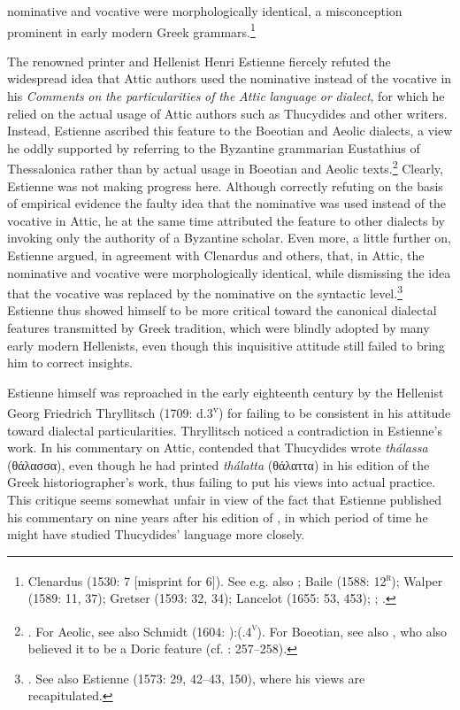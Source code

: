 nominative and vocative were morphologically identical, a misconception prominent in early modern Greek grammars.\footnote{Clenardus (1530: 7 [misprint for 6]). See e.g. also \citet[534]{Crusius1558}; Baile (1588: 12\textsc{\textsuperscript{r}}); Walper (1589: 11, 37); Gretser (1593: 32, 34); Lancelot (1655: 53, 453); \citet[101]{Giraudeau1739}; \citet[20]{Facius1782}.}

The renowned printer and Hellenist Henri Estienne fiercely refuted the widespread idea that Attic authors used the nominative instead of the vocative in his \textit{Comments} \textit{on} \textit{the} \textit{particularities} \textit{of} \textit{the} \textit{Attic} \textit{language} \textit{or} \textit{dialect}, for which he relied on the actual usage of Attic authors such as Thucydides and other writers. Instead, Estienne ascribed this feature to the Boeotian and Aeolic dialects, a view he oddly supported by referring to the Byzantine grammarian Eustathius of Thessalonica rather than by actual usage in Boeotian and Aeolic texts.\footnote{\citet[15]{Estienne1573}. For Aeolic, see also Schmidt (1604: ):(.4\textsc{\textsuperscript{v}}). For Boeotian, see also \citet[71]{Mérigon1621}, who also believed it to be a Doric feature (cf. \citealt{Maittaire1706}: 257–258).} Clearly, Estienne was not making progress here. Although correctly refuting on the basis of empirical evidence the faulty idea that the nominative was used instead of the vocative in Attic, he at the same time attributed the feature to other dialects by invoking only the authority of a Byzantine scholar. Even more, a little further on, Estienne argued, in agreement with Clenardus and others, that, in Attic, the nominative and vocative were morphologically identical, while dismissing the idea that the vocative was replaced by the nominative on the syntactic level.\footnote{\citet[17]{Estienne1573}. See also Estienne (1573: 29, 42–43, 150), where his views are recapitulated.} Estienne thus showed himself to be more critical toward the canonical dialectal features transmitted by Greek tradition, which were blindly adopted by many early modern Hellenists, even though this inquisitive attitude still failed to bring him to correct insights.

Estienne himself was reproached in the early eighteenth century by the Hellenist Georg Friedrich Thryllitsch (1709: d.3\textsuperscript{v}) for failing to be consistent in his attitude toward dialectal particularities. Thryllitsch noticed a contradiction in Estienne’s work. In his commentary on Attic, \citet[13]{Estienne1573} contended that Thucydides wrote \textit{thálassa} (θάλασσα), even though he had printed \textit{thálatta} (θάλαττα) in his edition of the Greek historiographer’s work, thus failing to put his views into actual practice. This critique seems somewhat unfair in view of the fact that Estienne published his commentary on \citet{Attic1573} nine years after his edition of \citet{Thucydides1564}, in which period of time he might have studied Thucydides’ language more closely.

